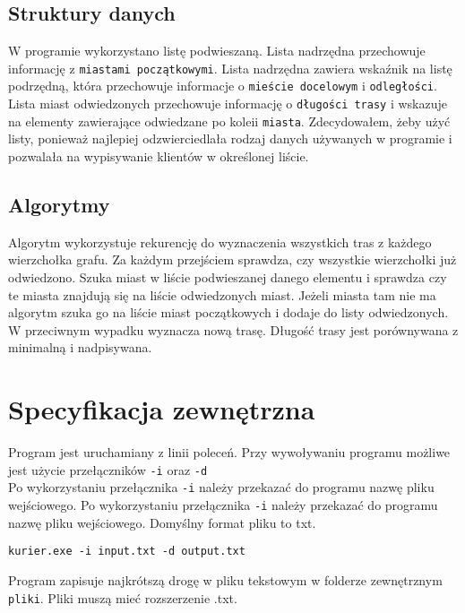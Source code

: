 \documentclass[12pt,a4paper,twoside]{article}
\let\oldmarginpar\marginpar
\renewcommand\marginpar[1]{%
  {\linespread{0.85}\normalfont\scriptsize%
\oldmarginpar[\hspace{1cm}\begin{minipage}{3cm}\raggedleft\scriptsize\color{black}\textsf{#1}\end{minipage}]%
{\hspace{0cm}\begin{minipage}{3cm}\raggedright\scriptsize\color{black}\textsf{#1}\end{minipage}}%
}%
}
\begin{document}
\subsection{Struktury danych}
\marginpar{}
W programie wykorzystano listę podwieszaną. Lista nadrzędna przechowuje informację z \texttt{miastami początkowymi}. Lista nadrzędna zawiera wskaźnik na listę podrzędną, która przechowuje informacje o \texttt{mieście docelowym}  i \texttt{odległości}. Lista miast odwiedzonych przechowuje informację o \texttt{długości trasy} i wskazuje  na elementy zawierające odwiedzane po koleii \texttt{miasta}. Zdecydowałem, żeby użyć listy, ponieważ najlepiej odzwierciedlała rodzaj danych używanych w programie i pozwalała na wypisywanie klientów w określonej liście.





\subsection{Algorytmy}
\marginpar{}
Algorytm wykorzystuje rekurencję do wyznaczenia wszystkich tras z każdego wierzchołka grafu. Za każdym przejściem sprawdza, czy wszystkie wierzchołki już odwiedzono. Szuka miast w liście podwieszanej danego elementu i sprawdza czy te miasta znajdują się na liście odwiedzonych miast. Jeżeli miasta tam nie ma algorytm szuka go na liście miast początkowych i dodaje do listy odwiedzonych. W przeciwnym wypadku wyznacza nową trasę. Długość trasy jest porównywana z minimalną i nadpisywana.


\section{Specyfikacja zewnętrzna}
\marginpar{}

Program jest uruchamiany z linii poleceń. 
Przy wywoływaniu programu możliwe jest użycie przełączników   \texttt{-i} oraz \texttt{-d}\\ 
Po wykorzystaniu przełącznika  \texttt{-i} należy przekazać do programu nazwę pliku wejściowego. Po wykorzystaniu przełącznika  \texttt{-i} należy przekazać do programu nazwę pliku wejściowego. Domyślny format pliku to txt.
\begin{verbatim}
kurier.exe -i input.txt -d output.txt
\end{verbatim}

Program zapisuje najkrótszą drogę w pliku tekstowym w folderze zewnętrznym \texttt{pliki}. 
Pliki muszą mieć rozszerzenie .txt.
\end{document}
